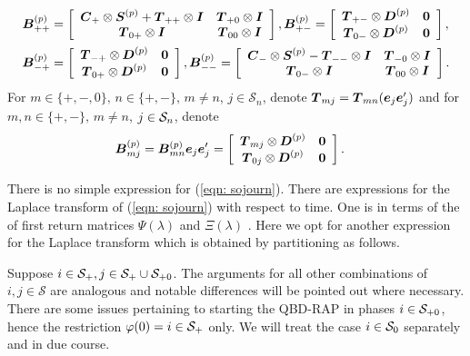 \begin{align*}
\bs{B}_{++}^{(p)} &= \left[\begin{array}{cc} \bs{C}_+\otimes \bs{S}^{(p)} + \bs{T}_{++}\otimes \bs{I} & \bs T_{+0}\otimes \bs I \\ \bs T_{0+}\otimes \bs I & \bs T_{00}\otimes \bs I\end{array}\right] ,
%
\bs{B}_{+-}^{(p)} = \left[\begin{array}{cc} \bs{T}_{+-}\otimes \bs{D}^{(p)} & \bs 0 \\ \bs T_{0-}\otimes \bs D^{(p)} & \bs 0 \end{array}\right],
%
\\ \bs{B}_{-+}^{(p)} &=  \left[\begin{array}{cc} \bs{T}_{-+}\otimes \bs{D}^{(p)} & \bs 0 \\ \bs T_{0+}\otimes \bs D^{(p)} & \bs 0 \end{array}\right] ,
% 
\bs{B}_{--}^{(p)} = \left[\begin{array}{cc} \bs{C}_-\otimes \bs{S}^{(p)} - \bs{T}_{--}\otimes \bs{I} & \bs T_{-0}\otimes \bs I \\ \bs T_{0-}\otimes \bs I & \bs T_{00}\otimes \bs I\end{array}\right].
\end{align*}
For \(m\in\{+,-,0\},\,n\in\{+,-\},\,m\neq n\), \(j\in\mathcal S_n\), denote \(\boldsymbol T_{mj} = \boldsymbol T_{mn} (\boldsymbol e_j\boldsymbol e_j')\) and for \(m,n\in\{+,-\},\,m\neq n\), \(j\in\mathcal{S}_n\), denote
\begin{align}
\boldsymbol{B}_{mj}^{(p)} &= \boldsymbol B_{mn}^{(p)} \boldsymbol e_j\boldsymbol e_j'= \left[\begin{array}{cc} \boldsymbol{T}_{mj}\otimes \boldsymbol{D}^{(p)} & \boldsymbol 0 \\ \boldsymbol T_{0j}\otimes \boldsymbol D^{(p)} & \boldsymbol 0 \end{array}\right].
\end{align}

There is no simple expression for (\ref{eqn: sojourn}). There are expressions for the Laplace transform of (\ref{eqn: sojourn}) with respect to time. One is in terms of the of first return matrices \(\Psi(\lambda)\) and \(\Xi(\lambda)\) \citep{bean2009}. Here we opt for another expression for the Laplace transform which is obtained by partitioning as follows.

Suppose \(i\in\mathcal{S}_+,j\in\mathcal S_+\cup\mathcal S_{+0}\). The arguments for all other combinations of \(i,j\in\mathcal S\) are analogous and notable differences will be pointed out where necessary. There are some issues pertaining to starting the QBD-RAP in phases \(i\in\mathcal{S}_{+0}\), hence the restriction \(\varphi(0)=i\in\mathcal{S}_+\) only. We will treat the case \(i\in\mathcal{S}_0\) separately and in due course.

